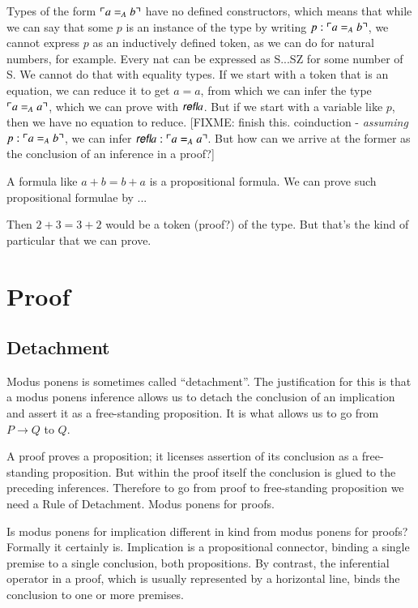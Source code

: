 \documentclass{article}
\begin{document}
Types of the form \(\ulcorner\Eq{A}{a}{b}\urcorner\) have no defined
constructors, which means that while we can say that some \(p\) is an
instance of the type by writing \(p:\ulcorner\Eq{A}{a}{b}\urcorner\),
we cannot express \(p\) as an inductively defined token, as we can do
for natural numbers, for example. Every nat can be expressed as S...SZ
for some number of S. We cannot do that with equality types. If we
start with a token that is an equation, we can reduce it to get
\(a=a\), from which we can infer the type
\(\ulcorner\Eq{A}{a}{a}\urcorner\), which we can prove with
\(\refl{a}\). But if we start with a variable like \(p\), then we have
no equation to reduce. [FIXME: finish this. coinduction -
  \textit{assuming} \(p:\ulcorner\Eq{A}{a}{b}\urcorner\), we can infer
  \(\refl{a}:\ulcorner\Eq{A}{a}{a}\urcorner\). But how can we arrive
  at the former as the conclusion of an inference in a proof?]

A formula like \(a+b=b+a\) is a propositional formula. We can
prove such propositional formulae by ...

Then \(2+3=3+2\) would be a token (proof?) of the type. But that's the
kind of particular that we can prove.

\section{Proof}

\subsection{Detachment}

Modus ponens is sometimes called ``detachment''. The justification for
this is that a modus ponens inference allows us to detach the
conclusion of an implication and assert it as a free-standing
proposition. It is what allows us to go from \(P\rightarrow Q\) to
\(Q\).

A proof proves a proposition; it licenses assertion of its conclusion
as a free-standing proposition. But within the proof itself the
conclusion is glued to the preceding inferences. Therefore to go from
proof to free-standing proposition we need a Rule of Detachment. Modus
ponens for proofs.

Is modus ponens for implication different in kind from modus ponens
for proofs? Formally it certainly is. Implication is a propositional
connector, binding a single premise to a single conclusion, both
propositions. By contrast, the inferential operator in a proof, which
is usually represented by a horizontal line, binds the conclusion to
one or more premises.
\end{document}
